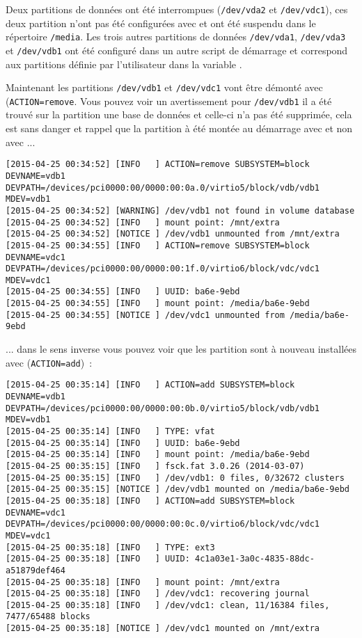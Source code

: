     Deux partitions de données ont été interrompues (\texttt{/dev/vda2} et
    \texttt{/dev/vdc1}), ces deux partition n'ont pas été configurées avec
	 et ont été suspendu dans le répertoire \texttt{/media}.
	Les trois autres partitions de données \texttt{/dev/vda1}, \texttt{/dev/vda3}
    et \texttt{/dev/vdb1} ont été configuré dans un autre script de démarrage et
	correspond aux partitions définie par l'utilisateur dans la variable .

    Maintenant les partitions \texttt{/dev/vdb1} et \texttt{/dev/vdc1} vont être
	démonté avec (\texttt{ACTION=remove}. Vous pouvez voir un avertissement pour
	\texttt{/dev/vdb1} il a été trouvé sur la partition une base de données et
	celle-ci n'a pas été supprimée, cela est sans danger et rappel que la partition
	à été montée au démarrage avec  et non avec ...

\begin{tiny}
\begin{verbatim}
[2015-04-25 00:34:52] [INFO   ] ACTION=remove SUBSYSTEM=block DEVNAME=vdb1 DEVPATH=/devices/pci0000:00/0000:00:0a.0/virtio5/block/vdb/vdb1 MDEV=vdb1
[2015-04-25 00:34:52] [WARNING] /dev/vdb1 not found in volume database
[2015-04-25 00:34:52] [INFO   ] mount point: /mnt/extra
[2015-04-25 00:34:52] [NOTICE ] /dev/vdb1 unmounted from /mnt/extra
[2015-04-25 00:34:55] [INFO   ] ACTION=remove SUBSYSTEM=block DEVNAME=vdc1 DEVPATH=/devices/pci0000:00/0000:00:1f.0/virtio6/block/vdc/vdc1 MDEV=vdc1
[2015-04-25 00:34:55] [INFO   ] UUID: ba6e-9ebd
[2015-04-25 00:34:55] [INFO   ] mount point: /media/ba6e-9ebd
[2015-04-25 00:34:55] [NOTICE ] /dev/vdc1 unmounted from /media/ba6e-9ebd
\end{verbatim}
\end{tiny}

	... dans le sens inverse vous pouvez voir que les partition sont à nouveau
	installées avec (\texttt{ACTION=add})~:

\begin{tiny}
\begin{verbatim}
[2015-04-25 00:35:14] [INFO   ] ACTION=add SUBSYSTEM=block DEVNAME=vdb1 DEVPATH=/devices/pci0000:00/0000:00:0b.0/virtio5/block/vdb/vdb1 MDEV=vdb1
[2015-04-25 00:35:14] [INFO   ] TYPE: vfat
[2015-04-25 00:35:14] [INFO   ] UUID: ba6e-9ebd
[2015-04-25 00:35:14] [INFO   ] mount point: /media/ba6e-9ebd
[2015-04-25 00:35:15] [INFO   ] fsck.fat 3.0.26 (2014-03-07)
[2015-04-25 00:35:15] [INFO   ] /dev/vdb1: 0 files, 0/32672 clusters
[2015-04-25 00:35:15] [NOTICE ] /dev/vdb1 mounted on /media/ba6e-9ebd
[2015-04-25 00:35:18] [INFO   ] ACTION=add SUBSYSTEM=block DEVNAME=vdc1 DEVPATH=/devices/pci0000:00/0000:00:0c.0/virtio6/block/vdc/vdc1 MDEV=vdc1
[2015-04-25 00:35:18] [INFO   ] TYPE: ext3
[2015-04-25 00:35:18] [INFO   ] UUID: 4c1a03e1-3a0c-4835-88dc-a51879def464
[2015-04-25 00:35:18] [INFO   ] mount point: /mnt/extra
[2015-04-25 00:35:18] [INFO   ] /dev/vdc1: recovering journal
[2015-04-25 00:35:18] [INFO   ] /dev/vdc1: clean, 11/16384 files, 7477/65488 blocks
[2015-04-25 00:35:18] [NOTICE ] /dev/vdc1 mounted on /mnt/extra
\end{verbatim}
\end{tiny}

